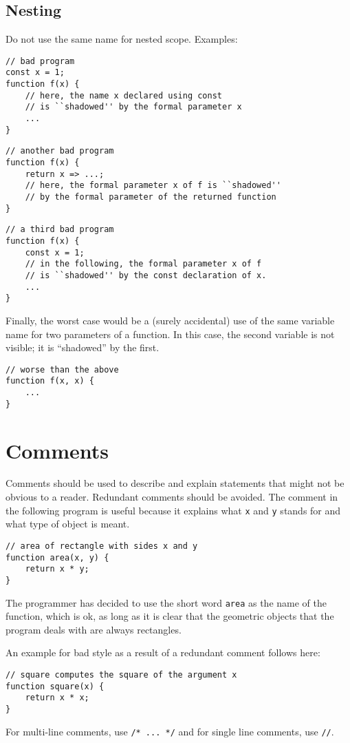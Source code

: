 \subsection*{Nesting}
Do not use the same name for nested scope. Examples:
\begin{lstlisting}
// bad program
const x = 1;
function f(x) {
    // here, the name x declared using const
    // is ``shadowed'' by the formal parameter x
    ...
}
\end{lstlisting}

\begin{lstlisting}
// another bad program
function f(x) {
    return x => ...;
    // here, the formal parameter x of f is ``shadowed'' 
    // by the formal parameter of the returned function
}
\end{lstlisting}

\begin{lstlisting}
// a third bad program
function f(x) {
    const x = 1;
    // in the following, the formal parameter x of f
    // is ``shadowed'' by the const declaration of x.
    ...
}
\end{lstlisting}
Finally, the worst case would be a (surely accidental) 
use of the same variable name for two parameters of a function.
In this case, the second variable is not visible; it is ``shadowed''
by the first.
\begin{lstlisting}
// worse than the above
function f(x, x) {
    ...
}
\end{lstlisting}

\section*{Comments}
Comments should be used to describe and explain statements 
that might not be obvious to a reader.
Redundant comments should be avoided. The comment in the following program is useful
because it explains what \lstinline{x} and \lstinline{y} stands for and what type of
object is meant. 
\begin{lstlisting}
// area of rectangle with sides x and y
function area(x, y) {
    return x * y;
}
\end{lstlisting}
The programmer has decided to use the short word \lstinline{area} as the name of the function,
which is ok, as long as it is clear that the geometric objects that the program deals with
are always rectangles.

An example for bad style as a result of a redundant comment follows here:
\begin{lstlisting}
// square computes the square of the argument x
function square(x) {
    return x * x;
}
\end{lstlisting}
%
For multi-line comments, use \lstinline{/* ... */} and for single line comments, use \lstinline{//}.



      
